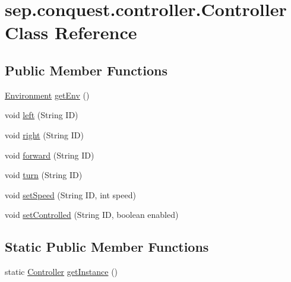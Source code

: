 \hypertarget{classsep_1_1conquest_1_1controller_1_1_controller}{
\section{sep.conquest.controller.Controller Class Reference}
\label{classsep_1_1conquest_1_1controller_1_1_controller}
}
\subsection*{Public Member Functions}
\begin{DoxyCompactItemize}
\item 
\hyperlink{classsep_1_1conquest_1_1model_1_1_environment}{Environment} \hyperlink{classsep_1_1conquest_1_1controller_1_1_controller_ac3ffd5fed7d1ae352e5866f23b010ae8}{getEnv} ()
\item 
void \hyperlink{classsep_1_1conquest_1_1controller_1_1_controller_a17c28df0b53aaa24cfcb76f1d0b447df}{left} (String ID)
\item 
void \hyperlink{classsep_1_1conquest_1_1controller_1_1_controller_adff7b008178ddc75166c8b24723bbe75}{right} (String ID)
\item 
void \hyperlink{classsep_1_1conquest_1_1controller_1_1_controller_ac508688d4af8054d8971a31060e22443}{forward} (String ID)
\item 
void \hyperlink{classsep_1_1conquest_1_1controller_1_1_controller_a643f99e64085cc2ae293e5c79029bac1}{turn} (String ID)
\item 
void \hyperlink{classsep_1_1conquest_1_1controller_1_1_controller_aebf11516ad236644e8f181621ddeb7c7}{setSpeed} (String ID, int speed)
\item 
void \hyperlink{classsep_1_1conquest_1_1controller_1_1_controller_ae8c091b3391609bec532e15cb9f548c9}{setControlled} (String ID, boolean enabled)
\end{DoxyCompactItemize}
\subsection*{Static Public Member Functions}
\begin{DoxyCompactItemize}
\item 
static \hyperlink{classsep_1_1conquest_1_1controller_1_1_controller}{Controller} \hyperlink{classsep_1_1conquest_1_1controller_1_1_controller_ae631762cd2a16e6890336d94d209a258}{getInstance} ()
\end{DoxyCompactItemize}
